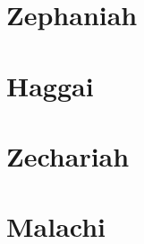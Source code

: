 \chapter{Zephaniah}
\begin{multicols}{2}
  \raggedcolumns
  \parskip=0pt \relax
  
\end{multicols}

\chapter{Haggai}
\begin{multicols}{2}
  \raggedcolumns
  \parskip=0pt \relax
  
\end{multicols}

\chapter{Zechariah}
\begin{multicols}{2}
  \raggedcolumns
  \parskip=0pt \relax
  
\end{multicols}

\chapter{Malachi}
\begin{multicols}{2}
  \raggedcolumns
  \parskip=0pt \relax
  
\end{multicols}

\newpage

\pagestyle{empty}

